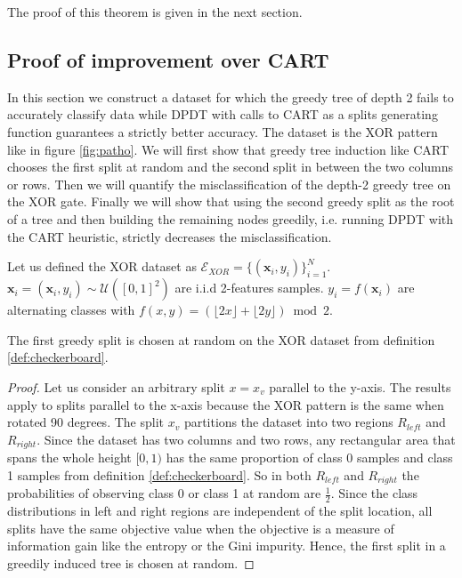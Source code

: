The proof of this theorem is given in the next section.

\subsection{Proof of improvement over CART}\label{proof-improve-opt}
In this section we construct a dataset for which the greedy tree of depth 2 fails to accurately classify data while DPDT with calls to CART as a splits generating function guarantees a strictly better accuracy. The dataset is the XOR pattern like in figure \ref{fig:patho}. We will first show that greedy tree induction like CART chooses the first split at random and the second split in between the two columns or rows. Then we will quantify the misclassification of the depth-2 greedy tree on the XOR gate. Finally we will show that using the second greedy split as the root of a tree and then building the remaining nodes greedily, i.e. running DPDT with the CART heuristic, strictly decreases the misclassification. 
\begin{definition}\label{def:checkerboard}
     Let us defined the XOR dataset as $\mathcal{E}_{XOR} = \{(\boldsymbol{x}_i, y_i)\}_{i=1}^N$. $\boldsymbol{x}_i = (\boldsymbol{x}_i, y_i) \sim \mathcal{U}([0,1]^2)$ are i.i.d 2-features samples. $y_i = f(\boldsymbol{x}_i)$ are alternating classes with $f(x,y) = (\lfloor 2x \rfloor + \lfloor 2y \rfloor) \bmod 2$.
\end{definition}

\begin{lemma} The first greedy split is chosen at random on the XOR dataset from definition \ref{def:checkerboard}.
\end{lemma}\label{lem:first-split}
\begin{proof}
Let us consider an arbitrary split $x = x_v$ parallel to the y-axis. The results apply to splits parallel to the x-axis because the XOR pattern is the same when rotated 90 degrees. The split $x_v$ partitions the dataset into two regions $R_{left}$ and $R_{right}$. Since the dataset has two columns and two rows, any rectangular area that spans the whole height $[0,1)$ has the same proportion of class 0 samples and class 1 samples from definition \ref{def:checkerboard}. So in both $R_{left}$ and $R_{right}$ the probabilities of observing class 0 or class 1 at random are $\frac{1}{2}$. Since the class distributions in left and right regions are independent of the split location, all splits have the same objective value when the objective is a measure of information gain like the entropy or the Gini impurity. Hence, the first split in a greedily induced tree is chosen at random.
\end{proof}

